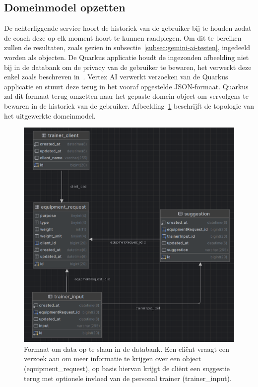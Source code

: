 \subsection{Domeinmodel opzetten}
\label{subsec:domeinmodel-opzetten}
De achterliggende service hoort de historiek van de gebruiker bij te houden zodat de coach deze op elk moment hoort te kunnen raadplegen.
Om dit te bereiken zullen de resultaten, zoals gezien in subsectie~\ref{subsec:gemini-ai-testen}, ingedeeld worden als objecten.
De Quarkus applicatie houdt de ingezonden afbeelding niet bij in de databank om de privacy van de gebruiker te bewaren, het verwerkt deze enkel zoals beschreven in~.
Vertex AI verwerkt verzoeken van de Quarkus applicatie en stuurt deze terug in het vooraf opgestelde JSON-formaat.
Quarkus zal dit formaat terug omzetten naar het gepaste domein object om vervolgens te bewaren in de historiek van de gebruiker.
Afbeelding~\ref{fig:domein-model} beschrijft de topologie van het uitgewerkte domeinmodel.
\begin{figure}[H]
    \begin{center}
        \includegraphics[scale=0.3]{images/domeinmodel}
        \caption{Formaat om data op te slaan in de databank. Een cliënt vraagt een verzoek aan om meer informatie te krijgen over een object (equipment\_request), op basis hiervan krijgt de cliënt een suggestie terug met optionele invloed van de personal trainer (trainer\_input).}
        \label{fig:domein-model}
    \end{center}
\end{figure}

